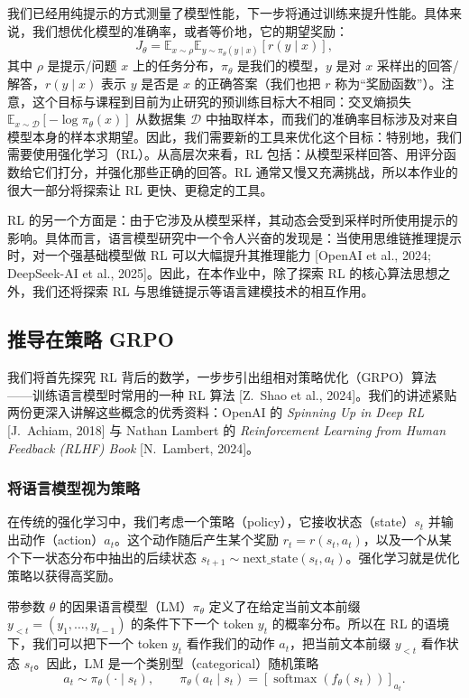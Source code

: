 我们已经用纯提示的方式测量了模型性能，下一步将通过训练来提升性能。具体来说，我们想优化模型的准确率，或者等价地，它的期望奖励：
\begin{equation}
J_\theta = \mathbb{E}_{x\sim\rho}\mathbb{E}_{y\sim\pi_\theta(y \mid x)}[r(y \mid x)],
\end{equation}
其中 $\rho$ 是提示/问题 $x$ 上的任务分布，$\pi_\theta$ 是我们的模型，$y$ 是对 $x$ 采样出的回答/解答，$r(y \mid x)$ 表示 $y$ 是否是 $x$ 的正确答案（我们也把 $r$ 称为“奖励函数”）。注意，这个目标与课程到目前为止研究的预训练目标大不相同：交叉熵损失 $\mathbb{E}_{x\sim\mathcal{D}}[-\log \pi_\theta(x)]$ 从数据集 $\mathcal{D}$ 中抽取样本，而我们的准确率目标涉及对来自模型本身的样本求期望。因此，我们需要新的工具来优化这个目标：特别地，我们需要使用强化学习（RL）。从高层次来看，RL 包括：从模型采样回答、用评分函数给它们打分，并强化那些正确的回答。RL 通常又慢又充满挑战，所以本作业的很大一部分将探索让 RL 更快、更稳定的工具。

RL 的另一个方面是：由于它涉及从模型采样，其动态会受到采样时所使用提示的影响。具体而言，语言模型研究中一个令人兴奋的发现是：当使用思维链推理提示时，对一个强基础模型做 RL 可以大幅提升其推理能力 [OpenAI et al., 2024; DeepSeek-AI et al., 2025]。因此，在本作业中，除了探索 RL 的核心算法思想之外，我们还将探索 RL 与思维链提示等语言建模技术的相互作用。

\subsection{推导在策略 GRPO}

我们将首先探究 RL 背后的数学，一步步引出组相对策略优化（GRPO）算法——训练语言模型时常用的一种 RL 算法 [Z.\ Shao et al., 2024]。我们的讲述紧贴两份更深入讲解这些概念的优秀资料：OpenAI 的 \textit{Spinning Up in Deep RL} [J.\ Achiam, 2018] 与 Nathan Lambert 的 \textit{Reinforcement Learning from Human Feedback (RLHF) Book} [N.\ Lambert, 2024]。

\subsubsection{将语言模型视为策略}

在传统的强化学习中，我们考虑一个策略（policy），它接收状态（state）$s_t$ 并输出动作（action）$a_t$。这个动作随后产生某个奖励 $r_t = r(s_t, a_t)$，以及一个从某个下一状态分布中抽出的后续状态 $s_{t+1} \sim \text{next\_state}(s_t, a_t)$。强化学习就是优化策略以获得高奖励。

带参数 $\theta$ 的因果语言模型（LM）$\pi_\theta$ 定义了在给定当前文本前缀 $y_{<t} = (y_1, \dots, y_{t-1})$ 的条件下下一个 token $y_t$ 的概率分布。所以在 RL 的语境下，我们可以把下一个 token $y_t$ 看作我们的动作 $a_t$，把当前文本前缀 $y_{<t}$ 看作状态 $s_t$。因此，LM 是一个类别型（categorical）随机策略
\begin{equation}
a_t \sim \pi_\theta(\cdot \mid s_t), \qquad \pi_\theta(a_t \mid s_t) = [\operatorname{softmax}(f_\theta(s_t))]_{a_t}.
\end{equation}

